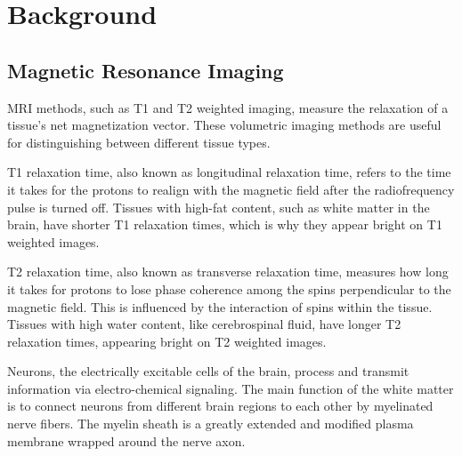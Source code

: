 \section{Background}

\subsection{Magnetic Resonance Imaging}

\ac{MRI} methods, such as T1 and T2 weighted imaging, measure the relaxation of a tissue's net magnetization vector. \cite{t1} These volumetric imaging methods are useful for distinguishing between different tissue types.\par
T1 relaxation time, also known as longitudinal relaxation time, refers to the time it takes for the protons to realign with the magnetic field after the radiofrequency pulse is turned off. Tissues with high-fat content, such as white matter in the brain, have shorter T1 relaxation times, which is why they appear bright on T1 weighted images. \cite{t1t2}\par
T2 relaxation time, also known as transverse relaxation time, measures how long it takes for protons to lose phase coherence among the spins perpendicular to the magnetic field. This is influenced by the interaction of spins within the tissue. Tissues with high water content, like cerebrospinal fluid, have longer T2 relaxation times, appearing bright on T2 weighted images. \cite{t1t2}\par

Neurons, the electrically excitable cells of the brain, process and transmit information via electro-chemical signaling. \cite{brain} The main function of the white matter is to connect neurons from different brain regions to each other by myelinated nerve fibers. \cite{white} The myelin sheath is a greatly extended and modified plasma membrane wrapped around the nerve axon. \cite{myelin}\par

